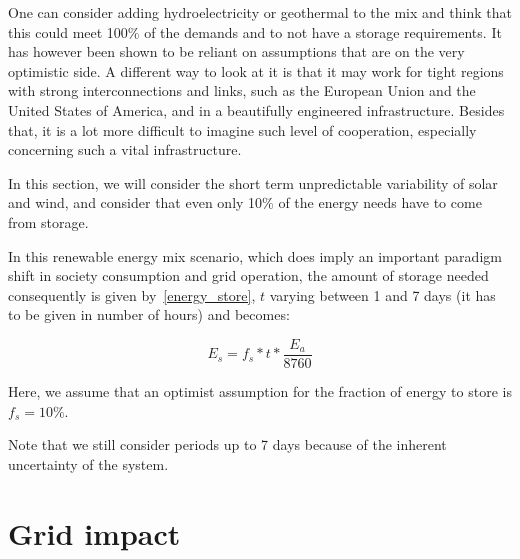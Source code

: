 One can consider adding hydroelectricity or geothermal to the mix and think that this could meet 100\% of the demands and to not have a storage requirements. It has however been shown to be reliant on assumptions that are on the very optimistic side. A different way to look at it is that it may work for tight regions with strong interconnections and links, such as the European Union and the United States of America, and in a beautifully engineered infrastructure. Besides that, it is a lot more difficult to imagine such level of cooperation, especially concerning such a vital infrastructure.

In this section, we will consider the short term unpredictable variability of solar and wind, and consider that even only 10\% of the energy needs have to come from storage.


\begin{remark}

In this renewable energy mix scenario, which does imply an important paradigm shift in society consumption and grid operation, the amount of storage needed consequently is given by~\ref{energy_store}, $t$ varying between 1 and 7 days (it has to be given in number of hours) and becomes:

\begin{equation}\label{energy_store}
E_s = f_s * t * \frac{E_a}{8760}
\end{equation}

Here, we assume that an optimist assumption for the fraction of energy to store is $f_s = 10\%$.

Note that we still consider periods up to 7 days because of the inherent uncertainty of the system.

\end{remark}




\section{Grid impact}

